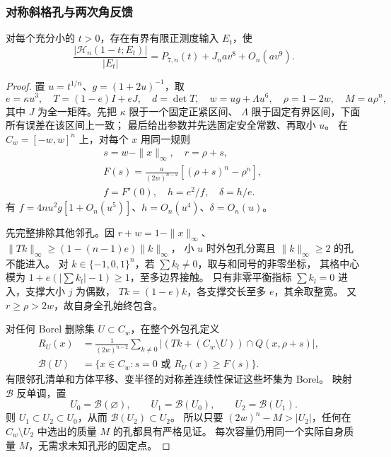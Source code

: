 \subsubsection{对称斜格孔与两次角反馈}

\begin{proposition}[宏观孔的有限输入构造]\label{eighth:macro-lower}
对每个充分小的 \(t>0\)，存在有界有限正测度输入 \(E_t\)，使
\begin{equation}\label{eighth:finite-lower}
 \frac{|\mathcal H_n(1-t;E_t)|}{|E_t|}
 =P_{7,n}(t)+J_nav^8+O_n(av^9).
\end{equation}
\end{proposition}
\begin{proof}
置 \(u=t^{1/n}\)、\(g=(1+2u)^{-1}\)，取
\[
 e=\kappa u^3,\quad T=(1-e)I+eJ,\quad d=\det T,\quad
 w=ug+\Lambda u^6,\quad \rho=1-2w,\quad M=a\rho^n ,
\]
其中 \(J\) 为全一矩阵。先把 \(\kappa\) 限于一个固定正紧区间、
\(\Lambda\) 限于固定有界区间，下面所有误差在该区间上一致；
最后给出参数并先选固定安全常数、再取小 \(u\)。
在 \(C_w=[-w,w]^n\) 上，对每个 \(x\) 用同一规则
\[
 \begin{aligned}
 &s=w-\|x\|_\infty,\quad r=\rho+s,\quad\\
 &F(s)=\frac{a}{(2w)^{n-2}}[(\rho+s)^n-\rho^n],\quad\\
 &f=F'(0),\quad h=e^2/f,\quad \delta=h/e.
 \end{aligned}
\]
有 \(f=4nu^2g[1+O_n(u^5)]\)、\(h=O_n(u^4)\)、\(\delta=O_n(u)\)。

先完整排除其他邻孔。因 \(r+w=1-\|x\|_\infty\)、
\(\|Tk\|_\infty\ge(1-(n-1)e)\|k\|_\infty\)，
小 \(u\) 时外包孔分离且 \(\|k\|_\infty\ge2\) 的孔不能进入。
对 \(k\in\{-1,0,1\}^n\)，若 \(\sum k_l\ne0\)，取与和同号的非零坐标，
其格中心模为 \(1+e(|\sum k_l|-1)\ge1\)，至多边界接触。
只有非零平衡指标 \(\sum k_l=0\) 进入，支撑大小 \(j\) 为偶数，
\(Tk=(1-e)k\)，各支撑交长至多 \(e\)，其余取整宽。
又 \(r\ge\rho>2w\)，故自身全孔始终包含。

对任何 Borel 删除集 \(U\subset C_w\)，在整个外包孔定义
\[
 \begin{aligned}
 R_U(x)&=\frac1{(2w)^{n-2}}\sum_{k\ne0}
       |(Tk+(C_w\setminus U))\cap Q(x,\rho+s)|,\quad\\
 \mathcal B(U)&=\{x\in C_w:s=0\text{ 或 }R_U(x)\ge F(s)\}.
 \end{aligned}
\]
有限邻孔清单和方体平移、变半径的对称差连续性保证这些坏集为 Borel。
映射 \(\mathcal B\) 反单调，置
\begin{equation}\label{eighth:three-sets}
 U_0=\mathcal B(\varnothing),\qquad U_1=\mathcal B(U_0),\qquad
 U_2=\mathcal B(U_1).
\end{equation}
则 \(U_1\subset U_2\subset U_0\)，从而 \(\mathcal B(U_2)\subset U_2\)。
所以只要 \((2w)^n-M>|U_2|\)，任何在 \(C_w\setminus U_2\)
中选出的质量 \(M\) 的孔都具有严格见证。
每次容量仍用同一个实际自身质量 \(M\)，无需求未知孔形的固定点。


\end{proof}
